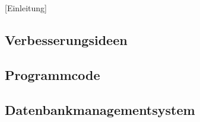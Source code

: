 [Einleitung]
\subsection{Verbesserungsideen}\label{subsec:verbesserungsideen}

\subsection{Programmcode}\label{subsec:programmcode}

\subsection{Datenbankmanagementsystem}\label{subsec:datenbankmanagementsystem}